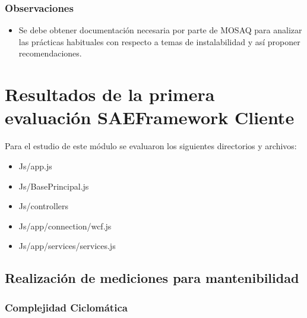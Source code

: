 \subsubsection{Observaciones}
\begin{itemize}
\item Se debe obtener documentación necesaria por parte de MOSAQ para analizar 
las prácticas habituales con respecto a temas de instalabilidad y así proponer recomendaciones.
\end{itemize}

\section{Resultados de la primera evaluación SAEFramework Cliente}

Para el estudio de este módulo se evaluaron los siguientes directorios y archivos:
\begin{itemize}
\item Js/app.js
\item Js/BasePrincipal.js
\item Js/controllers
\item Js/app/connection/wcf.js
\item Js/app/services/services.js
\end{itemize}


\subsection{Realización de mediciones para mantenibilidad}
\subsubsection{Complejidad Ciclomática}

